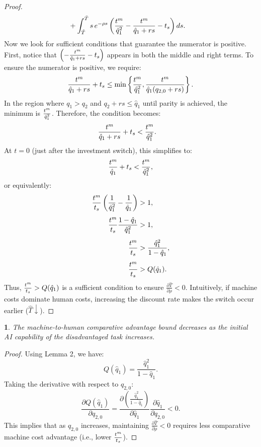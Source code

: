 \documentclass{article}
\theoremstyle{plain}
\theoremstyle{plain}
\newtheorem{cor}{\protect\corollaryname}
\newtheorem{cor}{\protect\corollaryname}[chapter]
\providecommand{\corollaryname}{Corollary}
\begin{document}
\begin{proof}
\begin{align*}
& + \int_{\tilde{T}}^{\bar{T}} s\,e^{-\rho s} \left(\frac{t^{m}_{}}{\hat{q}_{1}^{2}} - \frac{t^{m}_{}}{\hat{q}_{1} + rs} - t_{s}\right) ds.
\end{align*}
Now we look for sufficient conditions that guarantee the numerator is positive.  
First, notice that $\left(-\frac{t^{m}_{}}{\hat{q}_{1}+rs}-t_{s}\right)$ appears in both the middle and right terms.  
To ensure the numerator is positive, we require:
\[
\frac{t^{m}_{}}{\hat{q}_{1}+rs}+t_{s}\leq \min\left\{\frac{t^{m}_{}}{\hat{q}_{1}^{2}},\frac{t^{m}_{}}{\hat{q}_{1}(q_{2,0}+rs)}\right\}.
\]
In the region where $q_{1}>q_{2}$ and $q_{2}+rs\leq\hat{q}_{1}$ until parity is achieved, the minimum is $\frac{t^{m}_{}}{\hat{q}_{1}^{2}}$.  
Therefore, the condition becomes: 
\begin{align*}
\frac{t^{m}_{}}{\hat{q}_{1}+rs}+t_{s} & <\frac{t^{m}_{}}{\hat{q}_{1}^{2}}.
\end{align*}
At $t=0$ (just after the investment switch), this simplifies to:
\[
\frac{t^{m}_{}}{\hat{q}_{1}}+t_{s}<\frac{t^{m}_{}}{\hat{q}_{1}^{2}},
\]
or equivalently:
\begin{align*}
\frac{t^{m}_{}}{t_{s}}\left(\frac{1}{\hat{q}_{1}^{2}}-\frac{1}{\hat{q}_{1}}\right) & >1,\\[1ex]
\frac{t^{m}_{}}{t_{s}}\frac{1-\hat{q}_{1}}{\hat{q}_{1}^{2}} & >1,\\[1ex]
\frac{t^{m}_{}}{t_{s}} & >\frac{\hat{q}_{1}^{2}}{1-\hat{q}_{1}},\\[1ex]
\frac{t^{m}_{}}{t_{s}} & >Q(\hat{q}_{1}).
\end{align*}
Thus, $\frac{t^{m}_{}}{t_{s}}>Q(\hat{q}_{1})$ is a sufficient condition to ensure $\frac{\partial\hat{T}}{\partial\rho}<0$.  
Intuitively, if machine costs dominate human costs, increasing the discount rate makes the switch occur earlier ($\hat{T}\downarrow$).
\end{proof}

\begin{cor}
The machine-to-human comparative advantage bound decreases as the initial AI capability of the disadvantaged task increases.
\end{cor}

\begin{proof}
Using Lemma 2, we have:
\[
Q(\hat{q}_{1})=\frac{\hat{q}_{1}^{2}}{1-\hat{q}_{1}}.
\]
Taking the derivative with respect to $q_{2,0}$:
\[
\frac{\partial Q(\hat{q}_{1})}{\partial q_{2,0}}=\frac{\partial\left(\frac{\hat{q}_{1}^{2}}{1-\hat{q}_{1}}\right)}{\partial\hat{q}_{1}}\frac{\partial\hat{q}_{1}}{\partial q_{2,0}}<0.
\]
This implies that as $q_{2,0}$ increases, maintaining $\frac{\partial\hat{T}}{\partial\rho}<0$ requires less comparative machine cost advantage (i.e., lower $\frac{t^{m}_{}}{t_{s}}$).
\end{proof}
\end{document}
